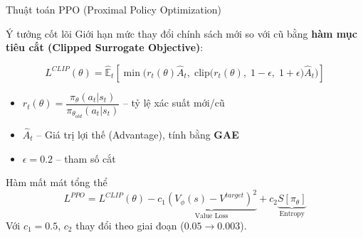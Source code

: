 \documentclass[aspectratio=169, 11pt]{beamer}
\begin{document}
\begin{frame}{Thuật toán PPO (Proximal Policy Optimization)}
  \begin{block}{Ý tưởng cốt lõi}
    Giới hạn mức thay đổi chính sách mới so với cũ bằng \textbf{hàm mục tiêu cắt (Clipped Surrogate Objective)}:
  \end{block}

  $$\boxed{L^{CLIP}(\theta) = \hat{\mathbb{E}}_t\left[\min\Big(r_t(\theta)\hat{A}_t,\;\text{clip}\big(r_t(\theta),\;1{-}\epsilon,\;1{+}\epsilon\big)\hat{A}_t\Big)\right]}$$

  \vspace{4pt}
  \begin{itemize}
    \item $r_t(\theta) = \dfrac{\pi_\theta(a_t|s_t)}{\pi_{\theta_{old}}(a_t|s_t)}$ -- tỷ lệ xác suất mới/cũ
    \item $\hat{A}_t$ -- Giá trị lợi thế (Advantage), tính bằng \textbf{GAE}
    \item $\epsilon = 0.2$ -- tham số cắt
  \end{itemize}

  \vspace{6pt}
  \begin{block}{Hàm mất mát tổng thể}
    $$L^{PPO} = L^{CLIP}(\theta) - c_1 \underbrace{(V_\phi(s) - V^{target})^2}_{\text{Value Loss}} + c_2 \underbrace{S[\pi_\theta]}_{\text{Entropy}}$$
    Với $c_1 = 0.5$, $c_2$ thay đổi theo giai đoạn ($0.05 \to 0.003$).
  \end{block}
\end{frame}
\end{document}
